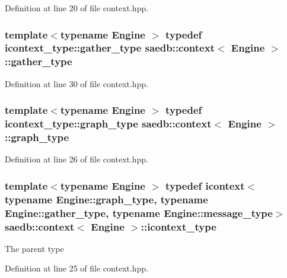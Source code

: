 Definition at line 20 of file context.\-hpp.

\hypertarget{classsaedb_1_1context_acce022e81537ee830f3df623f4f9e0d4}{
\subsubsection[{gather\-\_\-type}]{\setlength{\rightskip}{0pt plus 5cm}template$<$typename Engine $>$ typedef {\bf icontext\-\_\-type\-::gather\-\_\-type} {\bf saedb\-::context}$<$ Engine $>$\-::{\bf gather\-\_\-type}}}\label{d1/d89/classsaedb_1_1context_acce022e81537ee830f3df623f4f9e0d4}


Definition at line 30 of file context.\-hpp.

\hypertarget{classsaedb_1_1context_af74463841aa837f915f43fce2ca64dca}{
\subsubsection[{graph\-\_\-type}]{\setlength{\rightskip}{0pt plus 5cm}template$<$typename Engine $>$ typedef {\bf icontext\-\_\-type\-::graph\-\_\-type} {\bf saedb\-::context}$<$ Engine $>$\-::{\bf graph\-\_\-type}}}\label{d1/d89/classsaedb_1_1context_af74463841aa837f915f43fce2ca64dca}


Definition at line 26 of file context.\-hpp.

\hypertarget{classsaedb_1_1context_ae9df8581f3061e5caa9272039d969b18}{
\subsubsection[{icontext\-\_\-type}]{\setlength{\rightskip}{0pt plus 5cm}template$<$typename Engine $>$ typedef {\bf icontext}$<$typename {\bf Engine\-::graph\-\_\-type}, typename Engine\-::gather\-\_\-type, typename Engine\-::message\-\_\-type$>$ {\bf saedb\-::context}$<$ Engine $>$\-::{\bf icontext\-\_\-type}}}\label{d1/d89/classsaedb_1_1context_ae9df8581f3061e5caa9272039d969b18}
The parent type 

Definition at line 25 of file context.\-hpp.

